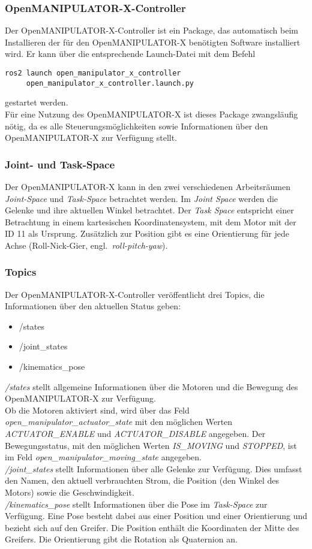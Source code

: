 \subsubsection{OpenMANIPULATOR-X-Controller}
Der OpenMANIPULATOR-X-Controller ist ein Package, das automatisch beim Installieren der für den OpenMANIPULATOR-X benötigten Software installiert wird.
Er kann über die entsprechende Launch-Datei mit dem Befehl
\begin{verbatim}
ros2 launch open_manipulator_x_controller 
     open_manipulator_x_controller.launch.py
\end{verbatim}
gestartet werden.\\
Für eine Nutzung des OpenMANIPULATOR-X ist dieses Package zwangsläufig nötig, da es alle Steuerungsmöglichkeiten sowie Informationen über den OpenMANIPULATOR-X zur Verfügung stellt.
\subsubsection{Joint- und Task-Space}
Der OpenMANIPULATOR-X kann in den zwei verschiedenen Arbeitsräumen \emph{Joint-Space} und \emph{Task-Space} betrachtet werden.
Im \emph{Joint Space} werden die Gelenke und ihre aktuellen Winkel betrachtet.
Der \emph{Task Space} entspricht einer Betrachtung in einem kartesischen Koordinatensystem, mit dem Motor mit der ID 11 als Ursprung.
Zusätzlich zur Position gibt es eine Orientierung für jede Achse (Roll-Nick-Gier, engl.\ \emph{roll-pitch-yaw}).
\subsubsection{Topics}
Der OpenMANIPULATOR-X-Controller veröffentlicht drei Topics, die Informationen über den aktuellen Status geben:
\begin{itemize}
    \item /states
    \item /joint\_states
    \item /kinematics\_pose
\end{itemize}
\emph{/states} stellt allgemeine Informationen über die Motoren und die Bewegung des OpenMANIPULATOR-X zur Verfügung.\\
Ob die Motoren aktiviert sind, wird über das Feld \emph{open\_manipulator\_actuator\_state} mit den möglichen Werten \emph{ACTUATOR\_ENABLE} und \emph{ACTUATOR\_DISABLE} angegeben.
Der Bewegungsstatus, mit den möglichen Werten \emph{IS\_MOVING} und \emph{STOPPED}, ist im Feld \emph{open\_manipulator\_moving\_state} angegeben.\\
\emph{/joint\_states} stellt Informationen über alle Gelenke zur Verfügung.
Dies umfasst den Namen, den aktuell verbrauchten Strom, die Position (den Winkel des Motors) sowie die Geschwindigkeit.\\
\emph{/kinematics\_pose} stellt Informationen über die Pose im \emph{Task-Space} zur Verfügung.
Eine Pose besteht dabei aus einer Position und einer Orientierung und bezieht sich auf den Greifer.
Die Position enthält die Koordinaten der Mitte des Greifers.
Die Orientierung gibt die Rotation als Quaternion an.


